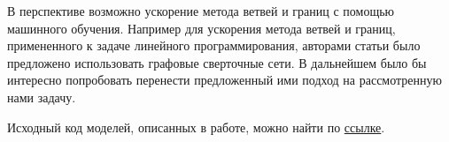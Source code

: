 \documentclass[12pt]{article}
\begin{document}
В перспективе возможно ускорение метода ветвей и границ с помощью машинного обучения. Например для ускорения метода ветвей и границ, примененного к задаче линейного программирования, авторами статьи \cite{Nair2020SolvingMI} было предложено использовать графовые сверточные сети. В дальнейшем было бы интересно попробовать перенести предложенный ими подход на рассмотренную нами задачу.

Исходный код моделей, описанных в работе, можно найти по \href{https://github.com/antony-frolov/ICOptimization}{ссылке}.

\newpage



\end{document}
